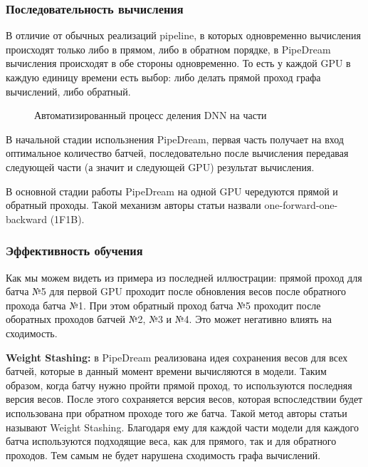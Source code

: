 
\subsubsection{Последовательность вычисления}
В отличие от обычных реализаций pipeline, в которых одновременно вычисления происходят только либо в прямом, либо в обратном порядке, в PipeDream вычисления происходят в обе стороны одновременно. То есть у каждой GPU в каждую единицу времени есть выбор: либо делать прямой проход графа вычислений, либо обратный. 

\begin{figure}[h]%
	\centering
	\caption{Автоматизированный процесс деления DNN на части}
	\label{framework} %
\end{figure}

В начальной стадии использнения PipeDream, первая часть получает на вход оптимальное количество батчей, последовательно после вычисления передавая следующей части (а значит и следующей GPU) результат вычисления. 

В основной стадии работы PipeDream на одной GPU чередуются прямой и обратный проходы. Такой механизм авторы статьи назвали one-forward-one-backward (1F1B).

\subsubsection{Эффективность обучения}
Как мы можем видеть из примера из последней иллюстрации: прямой проход для батча №5 для первой GPU проходит после обновления весов после обратного прохода батча №1. При этом обратный проход батча №5 проходит после оборатных проходов батчей №2, №3 и №4. Это может негативно влиять на сходимость.

\textbf{Weight Stashing:} в PipeDream реализована идея сохранения весов для всех батчей, которые в данный момент времени вычисляются в модели. Таким образом, когда батчу нужно пройти прямой проход, то используются последняя версия весов. После этого сохраняется версия весов, которая вспоследствии будет использована при обратном проходе того же батча. Такой метод авторы статьи называют Weight Stashing. Благодаря ему для каждой части модели для каждого батча используются подходящие веса, как для прямого, так и для обратного проходов. Тем самым не будет нарушена сходимость графа вычислений.

